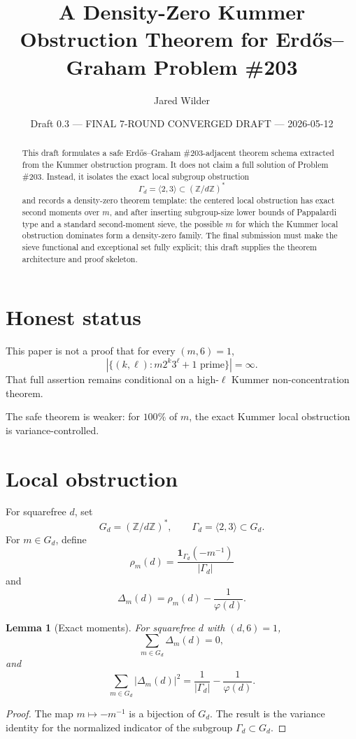 \documentclass[11pt]{article}
\title{A Density-Zero Kummer Obstruction Theorem for Erd\H{o}s--Graham Problem \#203}
\author{Jared Wilder}
\date{Draft 0.3 --- FINAL 7-ROUND CONVERGED DRAFT --- 2026-05-12}
\newtheorem{lemma}{Lemma}
\newcommand{\Z}{\mathbb Z}
\newcommand{\1}{\mathbf 1}
\begin{document}
\maketitle

\begin{abstract}
This draft formulates a safe Erd\H{o}s--Graham \#203-adjacent theorem schema extracted from the Kummer obstruction program.  It does not claim a full solution of Problem \#203.  Instead, it isolates the exact local subgroup obstruction
\[
\Gamma_d=\langle2,3\rangle\subset(\Z/d\Z)^*
\]
and records a density-zero theorem template: the centered local obstruction has exact second moments over \(m\), and after inserting subgroup-size lower bounds of Pappalardi type and a standard second-moment sieve, the possible \(m\) for which the Kummer local obstruction dominates form a density-zero family.  The final submission must make the sieve functional and exceptional set fully explicit; this draft supplies the theorem architecture and proof skeleton.
\end{abstract}

\section{Honest status}

This paper is not a proof that for every \((m,6)=1\),
\[
|\{(k,\ell):m2^k3^\ell+1\text{ prime}\}|=\infty.
\]
That full assertion remains conditional on a high-\(\ell\) Kummer non-concentration theorem.

The safe theorem is weaker: for \(100\%\) of \(m\), the exact Kummer local obstruction is variance-controlled.

\section{Local obstruction}

For squarefree \(d\), set
\[
G_d=(\Z/d\Z)^*,\qquad \Gamma_d=\langle2,3\rangle\subset G_d.
\]
For \(m\in G_d\), define
\[
\rho_m(d)=\frac{\1_{\Gamma_d}(-m^{-1})}{|\Gamma_d|}
\]
and
\[
\Delta_m(d)=\rho_m(d)-\frac1{\varphi(d)}.
\]

\begin{lemma}[Exact moments]\label{L:moments}
For squarefree \(d\) with \((d,6)=1\),
\[
\sum_{m\in G_d}\Delta_m(d)=0,
\]
and
\[
\sum_{m\in G_d}|\Delta_m(d)|^2=
\frac1{|\Gamma_d|}-\frac1{\varphi(d)}.
\]
\end{lemma}

\begin{proof}
The map \(m\mapsto -m^{-1}\) is a bijection of \(G_d\).  The result is the variance identity for the normalized indicator of the subgroup \(\Gamma_d\subset G_d\).
\end{proof}
\end{document}
